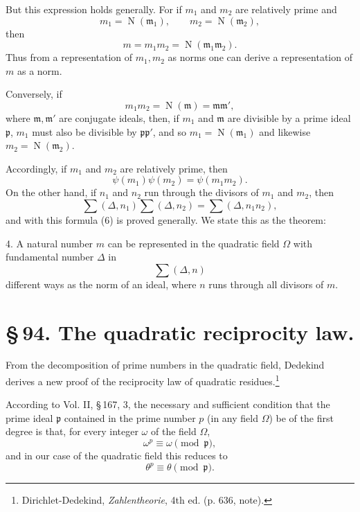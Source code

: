 \documentclass[11pt]{article}
\newcommand{\Norm}{\operatorname{N}}
\begin{document}
But this expression holds generally. For if $m_1$ and $m_2$ are relatively prime and
\[
 m_1=\Norm(\mathfrak m_1),\qquad m_2=\Norm(\mathfrak m_2),
\]
then
\[
 m=m_1m_2=\Norm(\mathfrak m_1\mathfrak m_2).
\]
Thus from a representation of $m_1,m_2$ as norms one can derive a representation of $m$ as a norm.

Conversely, if
\[
 m_1m_2=\Norm(\mathfrak m)=\mathfrak m\mathfrak m',
\]
where $\mathfrak m,\mathfrak m'$ are conjugate ideals, then, if $m_1$ and $\mathfrak m$ are divisible by a prime ideal $\mathfrak p$, $m_1$ must also be divisible by $\mathfrak p\mathfrak p'$, and so $m_1=\Norm(\mathfrak m_1)$ and likewise $m_2=\Norm(\mathfrak m_2)$.

Accordingly, if $m_1$ and $m_2$ are relatively prime, then
\begin{equation}
 \psi(m_1)\psi(m_2)=\psi(m_1m_2).
\tag{7}
\end{equation}
On the other hand, if $n_1$ and $n_2$ run through the divisors of $m_1$ and $m_2$, then
\[
 \sum(\Delta,n_1)\sum(\Delta,n_2)=\sum(\Delta,n_1n_2),
\]
and with this formula (6) is proved generally. We state this as the theorem:

4. A natural number $m$ can be represented in the quadratic field $\Omega$ with fundamental number $\Delta$ in
\[
 \sum(\Delta,n)
\]
different ways as the norm of an ideal, where $n$ runs through all divisors of $m$.

\section*{\S\,94. The quadratic reciprocity law.}

From the decomposition of prime numbers in the quadratic field, Dedekind derives a new proof of the reciprocity law of quadratic residues.\footnote{Dirichlet-Dedekind, \emph{Zahlentheorie}, 4th ed. (p. 636, note).}

According to Vol. II, \S\,167, 3, the necessary and sufficient condition that the prime ideal $\mathfrak p$ contained in the prime number $p$ (in any field $\Omega$) be of the first degree is that, for every integer $\omega$ of the field $\Omega$,
\begin{equation}
 \omega^p\equiv\omega\pmod{\mathfrak p},
\tag{1}
\end{equation}
and in our case of the quadratic field this reduces to
\begin{equation}
 \theta^p\equiv\theta\pmod{\mathfrak p}.
\tag{2}
\end{equation}
\end{document}
